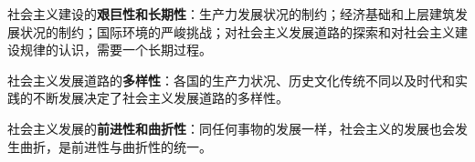 社会主义建设的\textbf{{艰巨性和长期性}}：生产力发展状况的制约；经济基础和上层建筑发展状况的制约；国际环境的严峻挑战；对社会主义发展道路的探索和对社会主义建设规律的认识，需要一个长期过程。

{社会主义发展道路的}\textbf{{多样性}}{：各国的生产力状况、历史文化传统不同以及时代和实践的不断发展决定了社会主义发展道路的多样性。}

{社会主义发展的}\textbf{{前进性和曲折性}}{：同任何事物的发展一样，社会主义的发展也会发生曲折，是前进性与曲折性的统一。}
